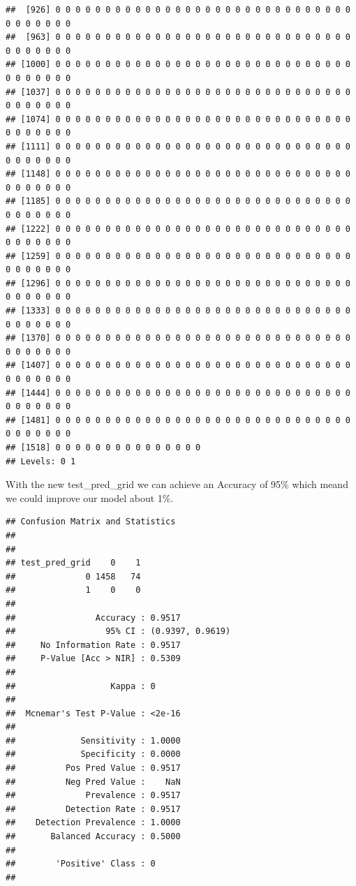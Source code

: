 \documentclass[
]{article}
\newenvironment{Shaded}{\begin{snugshade}}{\end{snugshade}}
\newcommand{\FunctionTok}[1]{\textcolor[rgb]{0.00,0.00,0.00}{#1}}
\newcommand{\NormalTok}[1]{#1}
\newcommand{\SpecialCharTok}[1]{\textcolor[rgb]{0.00,0.00,0.00}{#1}}
\renewcommand{\=}[1]{\stackrel{#1}{=}}
\theoremstyle{definition}
\theoremstyle{remark}
\begin{document}
\begin{verbatim}
##  [926] 0 0 0 0 0 0 0 0 0 0 0 0 0 0 0 0 0 0 0 0 0 0 0 0 0 0 0 0 0 0 0 0 0 0 0 0 0
##  [963] 0 0 0 0 0 0 0 0 0 0 0 0 0 0 0 0 0 0 0 0 0 0 0 0 0 0 0 0 0 0 0 0 0 0 0 0 0
## [1000] 0 0 0 0 0 0 0 0 0 0 0 0 0 0 0 0 0 0 0 0 0 0 0 0 0 0 0 0 0 0 0 0 0 0 0 0 0
## [1037] 0 0 0 0 0 0 0 0 0 0 0 0 0 0 0 0 0 0 0 0 0 0 0 0 0 0 0 0 0 0 0 0 0 0 0 0 0
## [1074] 0 0 0 0 0 0 0 0 0 0 0 0 0 0 0 0 0 0 0 0 0 0 0 0 0 0 0 0 0 0 0 0 0 0 0 0 0
## [1111] 0 0 0 0 0 0 0 0 0 0 0 0 0 0 0 0 0 0 0 0 0 0 0 0 0 0 0 0 0 0 0 0 0 0 0 0 0
## [1148] 0 0 0 0 0 0 0 0 0 0 0 0 0 0 0 0 0 0 0 0 0 0 0 0 0 0 0 0 0 0 0 0 0 0 0 0 0
## [1185] 0 0 0 0 0 0 0 0 0 0 0 0 0 0 0 0 0 0 0 0 0 0 0 0 0 0 0 0 0 0 0 0 0 0 0 0 0
## [1222] 0 0 0 0 0 0 0 0 0 0 0 0 0 0 0 0 0 0 0 0 0 0 0 0 0 0 0 0 0 0 0 0 0 0 0 0 0
## [1259] 0 0 0 0 0 0 0 0 0 0 0 0 0 0 0 0 0 0 0 0 0 0 0 0 0 0 0 0 0 0 0 0 0 0 0 0 0
## [1296] 0 0 0 0 0 0 0 0 0 0 0 0 0 0 0 0 0 0 0 0 0 0 0 0 0 0 0 0 0 0 0 0 0 0 0 0 0
## [1333] 0 0 0 0 0 0 0 0 0 0 0 0 0 0 0 0 0 0 0 0 0 0 0 0 0 0 0 0 0 0 0 0 0 0 0 0 0
## [1370] 0 0 0 0 0 0 0 0 0 0 0 0 0 0 0 0 0 0 0 0 0 0 0 0 0 0 0 0 0 0 0 0 0 0 0 0 0
## [1407] 0 0 0 0 0 0 0 0 0 0 0 0 0 0 0 0 0 0 0 0 0 0 0 0 0 0 0 0 0 0 0 0 0 0 0 0 0
## [1444] 0 0 0 0 0 0 0 0 0 0 0 0 0 0 0 0 0 0 0 0 0 0 0 0 0 0 0 0 0 0 0 0 0 0 0 0 0
## [1481] 0 0 0 0 0 0 0 0 0 0 0 0 0 0 0 0 0 0 0 0 0 0 0 0 0 0 0 0 0 0 0 0 0 0 0 0 0
## [1518] 0 0 0 0 0 0 0 0 0 0 0 0 0 0 0
## Levels: 0 1
\end{verbatim}

With the new test\_pred\_grid we can achieve an Accuracy of 95\% which meand we could improve our model about 1\%.

\begin{Shaded}
\end{Shaded}

\begin{verbatim}
## Confusion Matrix and Statistics
## 
##               
## test_pred_grid    0    1
##              0 1458   74
##              1    0    0
##                                           
##                Accuracy : 0.9517          
##                  95% CI : (0.9397, 0.9619)
##     No Information Rate : 0.9517          
##     P-Value [Acc > NIR] : 0.5309          
##                                           
##                   Kappa : 0               
##                                           
##  Mcnemar's Test P-Value : <2e-16          
##                                           
##             Sensitivity : 1.0000          
##             Specificity : 0.0000          
##          Pos Pred Value : 0.9517          
##          Neg Pred Value :    NaN          
##              Prevalence : 0.9517          
##          Detection Rate : 0.9517          
##    Detection Prevalence : 1.0000          
##       Balanced Accuracy : 0.5000          
##                                           
##        'Positive' Class : 0               
## 
\end{verbatim}
\end{document}
